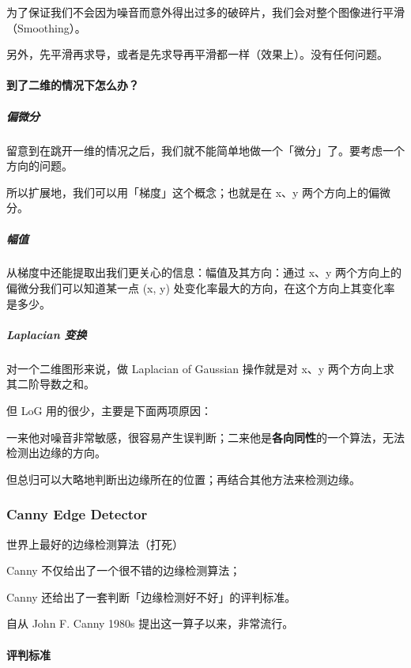 \documentclass[
]{article}
\begin{document}
为了保证我们不会因为噪音而意外得出过多的破碎片，我们会对整个图像进行平滑（Smoothing）。

另外，先平滑再求导，或者是先求导再平滑都一样（效果上）。没有任何问题。

\hypertarget{header-n96}{%
\paragraph{到了二维的情况下怎么办？}\label{header-n96}}

\hypertarget{header-n97}{%
\subparagraph{偏微分}\label{header-n97}}

留意到在跳开一维的情况之后，我们就不能简单地做一个「微分」了。要考虑一个方向的问题。

所以扩展地，我们可以用「梯度」这个概念；也就是在 x、y
两个方向上的偏微分。

\hypertarget{header-n100}{%
\subparagraph{幅值}\label{header-n100}}

从梯度中还能提取出我们更关心的信息：幅值及其方向：通过 x、y
两个方向上的偏微分我们可以知道某一点 (x, y)
处变化率最大的方向，在这个方向上其变化率是多少。

\hypertarget{header-n102}{%
\subparagraph{Laplacian 变换}\label{header-n102}}

对一个二维图形来说，做 Laplacian of Gaussian 操作就是对 x、y
两个方向上求其二阶导数之和。

但 LoG 用的很少，主要是下面两项原因：

一来他对噪音非常敏感，很容易产生误判断；二来他是\textbf{各向同性}的一个算法，无法检测出边缘的方向。

但总归可以大略地判断出边缘所在的位置；再结合其他方法来检测边缘。

\hypertarget{header-n107}{%
\subsubsection{Canny Edge Detector}\label{header-n107}}

世界上最好的边缘检测算法（打死）

Canny 不仅给出了一个很不错的边缘检测算法；

Canny 还给出了一套判断「边缘检测好不好」的评判标准。

自从 John F. Canny 1980s 提出这一算子以来，非常流行。

\hypertarget{header-n112}{%
\paragraph{评判标准}\label{header-n112}}
\end{document}
